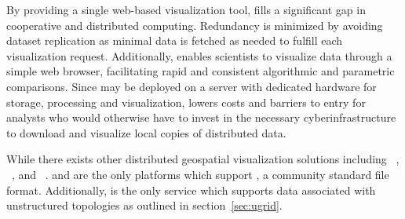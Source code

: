 By providing a single web-based visualization tool, \sciwms{} fills a
significant gap in cooperative and distributed computing. Redundancy
is minimized by avoiding dataset replication as minimal data is
fetched as needed to fulfill each visualization request. Additionally,
\sciwms{} enables scientists to visualize data through a simple web
browser, facilitating rapid and consistent algorithmic and parametric
comparisons. Since \sciwms{} may be deployed on a server with
dedicated hardware for storage, processing and visualization,
\sciwms{} lowers costs and barriers to entry for analysts who would
otherwise have to invest in the necessary cyberinfrastructure to
download and visualize local copies of distributed data.

While there exists other distributed geospatial visualization
solutions including \ncwms{}~\cite{blower13},
\mapserver{}~\cite{mapserver14}, and
\geoserver{}~\cite{geoserver14}. \sciwms{} and \ncwms{} are the only
platforms which support \netcdf{}, a community standard file
format. Additionally, \sciwms{} is the only service which supports
data associated with unstructured topologies as outlined in section~\ref{sec:ugrid}.




